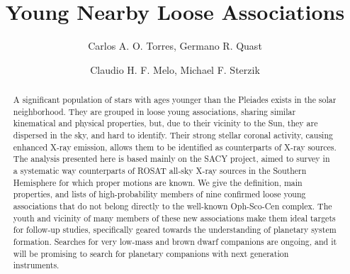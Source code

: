 \documentclass[11pt,twoside]{book}
\begin{document}
\title{Young Nearby Loose Associations }   %
\author{Carlos A. O. Torres, Germano R. Quast}   %


\author{Claudio H. F. Melo, Michael F. Sterzik}   %

\begin{abstract}
A significant population of stars
with ages younger than the Pleiades exists in the solar neighborhood.
They are grouped in loose young associations, sharing similar
kinematical and physical properties, but, due to their vicinity to the
Sun, they are dispersed in the sky, and hard to identify.  Their
strong stellar coronal activity, causing enhanced X-ray emission,
allows them to be identified as counterparts of X-ray sources.  The
analysis presented here is based mainly on the SACY project, aimed to
survey in a systematic way counterparts of ROSAT all-sky X-ray sources
in the Southern Hemisphere for which proper motions are known.  We
give the definition, main properties, and lists of high-probability
members of nine confirmed loose young associations that do not belong
directly to the well-known Oph-Sco-Cen complex.  The youth and
vicinity of many members of these new associations make them ideal
targets for follow-up studies, specifically geared towards the
understanding of planetary system formation.  Searches for very
low-mass and brown dwarf companions are ongoing, and it will be
promising to search for planetary companions with next generation
instruments.




\end{abstract}


\end{document}
